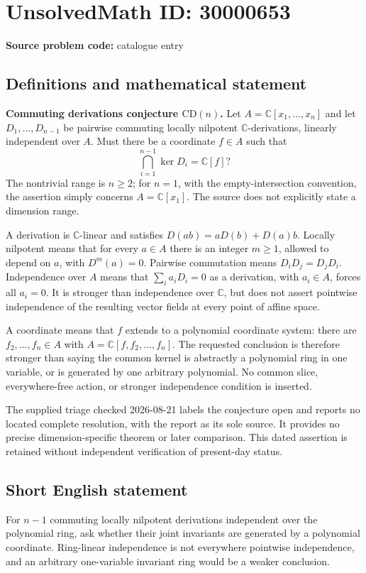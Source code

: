 \documentclass[11pt]{article}
\newcommand{\C}{\mathbb{C}}
\begin{document}
\section*{UnsolvedMath ID: 30000653}
\textbf{Source problem code:} catalogue entry
\subsection{Definitions and mathematical statement}
\textbf{Commuting derivations conjecture \(\mathrm{CD}(n)\).} Let \(A=\C[x_1,\ldots,x_n]\) and let \(D_1,\ldots,D_{n-1}\) be pairwise commuting locally nilpotent \(\C\)-derivations, linearly independent over \(A\). Must there be a coordinate \(f\in A\) such that\[\bigcap_{i=1}^{n-1}\ker D_i=\C[f]?\] The nontrivial range is \(n\ge2\); for \(n=1\), with the empty-intersection convention, the assertion simply concerns \(A=\C[x_1]\). The source does not explicitly state a dimension range.\par A derivation is \(\C\)-linear and satisfies \(D(ab)=aD(b)+D(a)b\). Locally nilpotent means that for every \(a\in A\) there is an integer \(m\ge1\), allowed to depend on \(a\), with \(D^m(a)=0\). Pairwise commutation means \(D_iD_j=D_jD_i\). Independence over \(A\) means that \(\sum_i a_iD_i=0\) as a derivation, with \(a_i\in A\), forces all \(a_i=0\). It is stronger than independence over \(\C\), but does not assert pointwise independence of the resulting vector fields at every point of affine space.\par A coordinate means that \(f\) extends to a polynomial coordinate system: there are \(f_2,\ldots,f_n\in A\) with \(A=\C[f,f_2,\ldots,f_n]\). The requested conclusion is therefore stronger than saying the common kernel is abstractly a polynomial ring in one variable, or is generated by one arbitrary polynomial. No common slice, everywhere-free action, or stronger independence condition is inserted.\par The supplied triage checked 2026-08-21 labels the conjecture open and reports no located complete resolution, with the report as its sole source. It provides no precise dimension-specific theorem or later comparison. This dated assertion is retained without independent verification of present-day status.
\subsection{Short English statement}
For \(n-1\) commuting locally nilpotent derivations independent over the polynomial ring, ask whether their joint invariants are generated by a polynomial coordinate. Ring-linear independence is not everywhere pointwise independence, and an arbitrary one-variable invariant ring would be a weaker conclusion.
\end{document}
